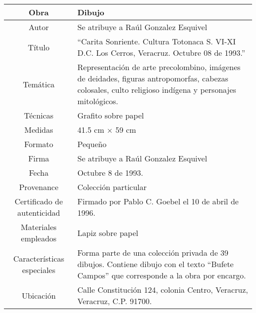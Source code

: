 \documentclass[10pt,letter]{report}
\begin{document}
\begin{table}[H]
\centering
\begin{tabular}{|c|m{}|}
\hline
Obra& Dibujo	\\
\hline
Autor & Se atribuye a Ra\'ul Gonzalez Esquivel\\
\hline
T\'itulo &``Carita Sonriente. Cultura Totonaca S. VI-XI D.C. Los Cerros, Veracruz. Octubre 08 de 1993.'' \\
\hline
Tem\'atica & Representaci\'on de arte precolombino, im\'agenes de deidades, figuras antropomorfas, cabezas colosales, culto religioso ind\'igena y personajes mitol\'ogicos.\\
\hline
T\'ecnicas &Grafito sobre papel \\
\hline
Medidas & 41.5 cm $\times$ 59 cm \\
\hline
 Formato & Peque\~no \\
 \hline
 Firma & Se atribuye a Ra\'ul Gonzalez Esquivel\\ 
 \hline
  Fecha & Octubre 8 de 1993.\\
 \hline
 Provenance & Colecci\'on particular\\
 \hline
 Certificado de autenticidad& Firmado por Pablo C. Goebel el 10 de abril de 1996.  \\
 \hline 
  Materiales empleados & Lapiz sobre papel\\
 \hline
 Caracter\'isticas especiales & Forma parte de una colecci\'on privada de 39 dibujos. 
Contiene dibujo con el texto ``Bufete Campos'' que corresponde a la obra por encargo. \\
\hline 
Ubicaci\'on & Calle Constituci\'on 124, colonia Centro, Veracruz, Veracruz, C.P. 91700.\\
\hline

\end{tabular}
\end{table}
\end{document}
